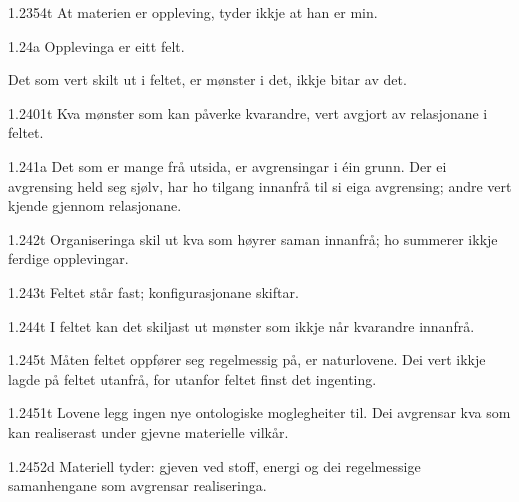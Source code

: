 \begin{formproposition}{1.2354}{t}
At materien er oppleving, tyder ikkje at han er min.
\end{formproposition}

\begin{formproposition}{1.24}{a}
Opplevinga er eitt felt.

Det som vert skilt ut i feltet, er mønster i det, ikkje bitar av det.
\end{formproposition}

\begin{formproposition}{1.2401}{t}
Kva mønster som kan påverke kvarandre, vert avgjort av relasjonane i feltet.
\end{formproposition}

\begin{formproposition}{1.241}{a}
Det som er mange frå utsida, er avgrensingar i éin grunn. Der ei avgrensing held seg sjølv, har ho tilgang innanfrå til si eiga avgrensing; andre vert kjende gjennom relasjonane.
\end{formproposition}

\begin{formproposition}{1.242}{t}
Organiseringa skil ut kva som høyrer saman innanfrå; ho summerer ikkje ferdige opplevingar.
\end{formproposition}

\begin{formproposition}{1.243}{t}
Feltet står fast; konfigurasjonane skiftar.
\end{formproposition}

\begin{formproposition}{1.244}{t}
I feltet kan det skiljast ut mønster som ikkje når kvarandre innanfrå.
\end{formproposition}

\begin{formproposition}{1.245}{t}
Måten feltet oppfører seg regelmessig på, er naturlovene. Dei vert ikkje lagde på feltet utanfrå, for utanfor feltet finst det ingenting.
\end{formproposition}

\begin{formproposition}{1.2451}{t}
Lovene legg ingen nye ontologiske moglegheiter til. Dei avgrensar kva som kan realiserast under gjevne materielle vilkår.
\end{formproposition}

\begin{formproposition}{1.2452}{d}
Materiell tyder: gjeven ved stoff, energi og dei regelmessige samanhengane som avgrensar realiseringa.
\end{formproposition}

